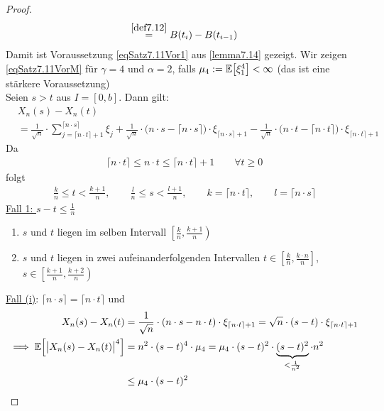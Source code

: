 \begin{proof}
\begin{align*}
{		\overset{\ref{def7.12}}{=}B(t_i)-B(t_{i-1})}
	\end{align*}
	Damit ist Voraussetzung \eqref{eqSatz7.11Vor1} aus \ref{lemma7.14} gezeigt.\nl
	Wir zeigen \eqref{eqSatz7.11VorM} für $\gamma=4$ und $\alpha=2$, falls $\mu_4:=\mathbb{E}\big[\xi_1^4\big]<\infty$ (das ist eine stärkere Voraussetzung)\\
	Seien $s>t$ aus $I=[0,b]$. 
	Dann gilt:
	\begin{align}\label{eqProof7.16Plus}\tag{+}
		&X_n(s)-X_n(t)\\
		&=\frac{1}{\sqrt{n}}\cdot\sum\limits_{j=\lceil n\cdot t\rceil+1}^{\lceil n\cdot s\rceil}\xi_j+\frac{1}{\sqrt{n}}\cdot\big(n\cdot s-\lceil n\cdot s\rceil\big)\cdot\xi_{\lceil n\cdot s\rceil+1}
		-\frac{1}{\sqrt{n}}\cdot\big(n\cdot t-\lceil n\cdot t\rceil\big)\cdot\xi_{\lceil n\cdot t\rceil+1}\nonumber
	\end{align}
	Da 
	\begin{align}\label{eqProof7.16PlusPlus}\tag{++}
		\lceil n\cdot t\rceil\leq n\cdot t\leq\lceil n\cdot t\rceil+1\qquad\forall t\geq0
	\end{align}
	folgt
	\begin{align*}
		\frac{k}{n}\leq t<\frac{k+1}{n},\qquad\frac{l}{n}\leq s<\frac{l+1}{n},\qquad k=\lceil n\cdot t\rceil,\qquad l=\lceil n\cdot s\rceil
	\end{align*}
	\underline{Fall 1: $s-t\leq\frac{1}{n}$}
	\begin{enumerate}[label=(\roman*)]
		\item $s$ und $t$ liegen im selben Intervall $\left[\frac{k}{n},\frac{k+1}{n}\right)$
		\item $s$ und $t$ liegen in zwei aufeinanderfolgenden Intervallen $t\in\left[\frac{k}{n},\frac{k\cdot n}{n}\right]$, $s\in\left[\frac{k+1}{n},\frac{k+2}{n}\right)$
	\end{enumerate}
	\ul{Fall (i)}: $\lceil n\cdot s\rceil=\lceil n\cdot t\rceil$ und
	\begin{align*}
		X_n(s)-X_n(t)
		&=\frac{1}{\sqrt{n}}\cdot(n\cdot s-n\cdot t)\cdot\xi_{\lceil n\cdot t\rceil+1}
		=\sqrt{n}\cdot(s-t)\cdot\xi_{\lceil n\cdot t\rceil+1}\\
		\implies
		\mathbb{E}\Big[\big|X_n(s)-X_n(t)\big|^4\Big]
		&=n^2\cdot(s-t)^4\cdot\mu_4
		=\mu_4\cdot(s-t)^2\cdot\underbrace{(s-t)^2}_{<\frac{1}{n^2}}\cdot n^2\\
		&\leq\mu_4\cdot(s-t)^2
	\end{align*}

\end{proof}
